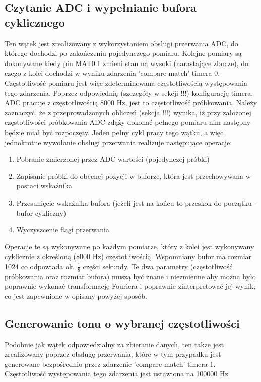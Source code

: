 \subsection{Czytanie ADC i wypełnianie bufora cyklicznego}
Ten wątek jest zrealizowany z wykorzystaniem obsługi przerwania ADC, do którego dochodzi po zakończeniu pojedynczego pomiaru. Kolejne pomiary są dokonywane kiedy pin MAT0.1 zmieni stan na wysoki (narastające zbocze), do czego z kolei dochodzi w wyniku zdarzenia 'compare match' timera 0. Częstotliwość pomiaru jest więc zdeterminowana częstotliwością występowania tego zdarzenia. Poprzez odpowiednią (szczegóły w sekcji !!!) konfigurację timera, ADC pracuje z częstotliwością 8000 Hz, jest to częstotliwość próbkowania. Należy zaznaczyć, że z przeprowadzonych obliczeń (sekcja !!!) wynika, iż przy założonej częstotliwości próbkowania ADC zdąży dokonać pełnego pomiaru nim następny będzie miał być rozpoczęty. Jeden pełny cykl pracy tego wątku, a więc jednokrotne wywołanie obsługi przerwania realizuje następujące operacje:
\begin{enumerate}
    \item Pobranie zmierzonej przez ADC wartości (pojedynczej próbki)
    \item Zapisanie próbki do obecnej pozycji w buforze, która jest przechowywana w postaci wskaźnika
    \item Przesunięcie wskaźnika bufora (jeżeli jest na końcu to przeskok do początku - bufor cykliczny)
    \item Wyczyszcenie flagi przerwania
\end{enumerate}
Operacje te są wykonywane po każdym pomiarze, który z kolei jest wykonywany cyklicznie z określoną (8000 Hz) częstotliwością. Wspomniany bufor ma rozmiar 1024 co odpowiada ok. $\frac{1}{8}$ części sekundy. Te dwa parametry (częstotliwość próbkowania oraz rozmiar bufora) muszą być znane i niezmienne aby można było poprawnie wykonać transformację Fouriera i poprawnie zinterpretować jej wynik, co jest zapewnione w opisany powyżej sposób.

\subsection{Generowanie tonu o wybranej częstotliwości}
Podobnie jak wątek odpowiedzialny za zbieranie danych, ten także jest zrealizowany poprzez obsługę przerwania, które w tym przypadku jest generowane bezpośrednio przez zdarzenie 'compare match' timera 1. Częstotliwość występowania tego zdarzenia jest ustawiona na 100000 Hz.

